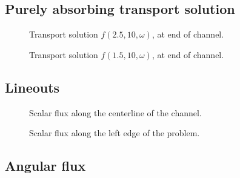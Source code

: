 \documentclass{beamer}
\begin{document}
\subsection{Purely absorbing transport solution}
\begin{frame}
\begin{figure}[tb]
  \centering
  
  \caption{Transport solution $f(2.5,10,\omega)$, at end of channel.}
  \label{fig:fMid}
\end{figure}
\end{frame}

\begin{frame}
\begin{figure}[tb]
  \centering
  
  \caption{Transport solution $f(1.5,10,\omega)$, at end of channel.}
  \label{fig:fLeft}
\end{figure}
\end{frame}

\subsection{Lineouts}
\begin{frame}
\begin{figure}[tb]
  \centering
  
  \caption{Scalar flux along the centerline of the channel.}
  \label{fig:phiChannel}
\end{figure}
\end{frame}

\begin{frame}
\begin{figure}[tb]
  \centering
  
  \caption{Scalar flux along the left edge of the problem.}
  \label{fig:phiLeft}
\end{figure}
\end{frame}

\subsection{Angular flux}
%  
\end{document}
